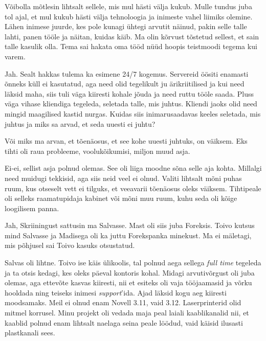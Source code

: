 Võibolla mõtlesin lihtsalt sellele, mis mul hästi välja kukub. Mulle tundus juba tol ajal, et mul kukub hästi välja tehnoloogia ja inimeste vahel liimiks 
olemine. Lähen inimese juurde, kes pole kunagi ühtegi arvutit 
näinud, pakin selle talle lahti, panen tööle ja näitan, kuidas käib. Ma 
olin kõrvust tõstetud sellest, et sain talle kasulik olla. Tema sai hakata oma tööd 
nüüd hoopis teistmoodi tegema kui varem. 


Jah. Sealt hakkas tulema ka esimene 24/7 kogemus. Servereid
öösiti enamasti õnneks küll ei kasutatud, aga need olid tegelikult ju 
ärikriitilised ja kui need läksid maha, siis tuli väga kiiresti kohale jõuda ja 
need ruttu tööle saada. Pluss väga vihase kliendiga tegeleda, 
seletada talle, mis juhtus. Kliendi jaoks olid need mingid maagilised kastid 
nurgas. Kuidas siis inimarusaadavas keeles seletada, mis juhtus ja miks sa 
arvad, et seda uuesti ei juhtu?


Või miks ma arvan, et tõenäosus, et see kohe uuesti juhtuks, on 
väiksem. Eks tihti oli raua probleeme, voolukõikumisi, miljon muud 
asja. 


Ei-ei, sellist asja polnud olemas. See oli liiga moodne sõna selle aja kohta. 
Millalgi need muidugi tekkisid, aga siis neid veel ei olnud. Valiti lihtsalt mõni 
puhas ruum, kus otseselt vett ei tilguks, et veeavarii tõenäosus 
oleks väiksem. Tihtipeale oli selleks raamatupidaja kabinet või mõni muu ruum, kuhu seda oli kõige 
loogilisem panna. 


Jah, Skriiningust sattusin ma Salvasse. Mast oli siis juba 
Foreksis. Toivo kutsus mind Salvasse ja Madisega oli ka juttu 
Forekspanka minekust. Ma ei mäletagi, mis põhjusel sai 
Toivo kasuks otsustatud. 

Salvas oli lihtne. Toivo ise käis ülikoolis, tal 
polnud aega sellega \emph{full time} tegeleda ja ta otsis kedagi, kes oleks 
päeval kontoris kohal. Midagi arvutivõrgust oli juba olemas, aga 
ettevõte kasvas kiiresti, nii et esiteks oli vaja tööjaamasid ja võrku 
hooldada ning teiseks inimesi \emph{support}'ida. Ajad läksid kogu aeg kiiresti moodsamaks. Meil ei olnud enam 
Novell 3.11, vaid 3.12. Laserprinterid olid mitmel korrusel. Minu projekt oli vedada maja peal laiali kaablikanalid nii, et kaablid 
polnud enam lihtsalt naelaga seina peale löödud, vaid käisid ilusasti 
plastkanali sees. 


